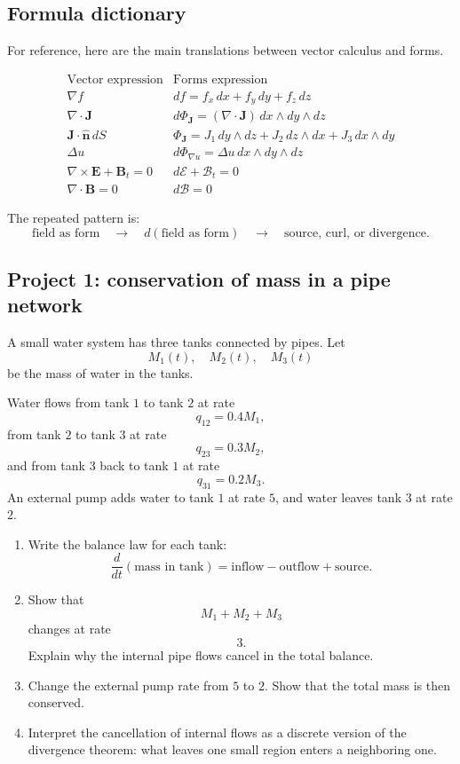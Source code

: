\subsection{Formula dictionary}

For reference, here are the main translations between vector calculus and forms.

\[
\begin{array}{c|c}
\text{Vector expression} & \text{Forms expression} \\ \hline
\nabla f &
df=f_x\,dx+f_y\,dy+f_z\,dz
\\[2mm]
\nabla\cdot\mathbf J &
d\Phi_{\mathbf J}
=
(\nabla\cdot\mathbf J)\,dx\wedge dy\wedge dz
\\[2mm]
\mathbf J\cdot\widehat{\mathbf n}\,dS &
\Phi_{\mathbf J}
=
J_1\,dy\wedge dz+J_2\,dz\wedge dx+J_3\,dx\wedge dy
\\[2mm]
\Delta u &
d\Phi_{\nabla u}
=
\Delta u\,dx\wedge dy\wedge dz
\\[2mm]
\nabla\times\mathbf E+\mathbf B_t=0 &
d\mathcal E+\mathcal B_t=0
\\[2mm]
\nabla\cdot\mathbf B=0 &
d\mathcal B=0
\end{array}
\]

The repeated pattern is:
\[
\boxed{
    \text{field as form}
    \quad\longrightarrow\quad
    d(\text{field as form})
    \quad\longrightarrow\quad
    \text{source, curl, or divergence.}
}
\]

\subsection{Project 1: conservation of mass in a pipe network}

A small water system has three tanks connected by pipes.  Let
\[
    M_1(t),\quad M_2(t),\quad M_3(t)
\]
be the mass of water in the tanks.

Water flows from tank \(1\) to tank \(2\) at rate
\[
    q_{12}=0.4M_1,
\]
from tank \(2\) to tank \(3\) at rate
\[
    q_{23}=0.3M_2,
\]
and from tank \(3\) back to tank \(1\) at rate
\[
    q_{31}=0.2M_3.
\]
An external pump adds water to tank \(1\) at rate \(5\), and water leaves tank \(3\) at
rate \(2\).

\begin{enumerate}
\item Write the balance law for each tank:
\[
    \frac{d}{dt}(\text{mass in tank})
    =
    \text{inflow}-\text{outflow}+\text{source}.
\]

\item Show that
\[
    M_1+M_2+M_3
\]
changes at rate
\[
    3.
\]
Explain why the internal pipe flows cancel in the total balance.

\item Change the external pump rate from \(5\) to \(2\).  Show that the total mass is
then conserved.

\item Interpret the cancellation of internal flows as a discrete version of the divergence
theorem: what leaves one small region enters a neighboring one.
\end{enumerate}

